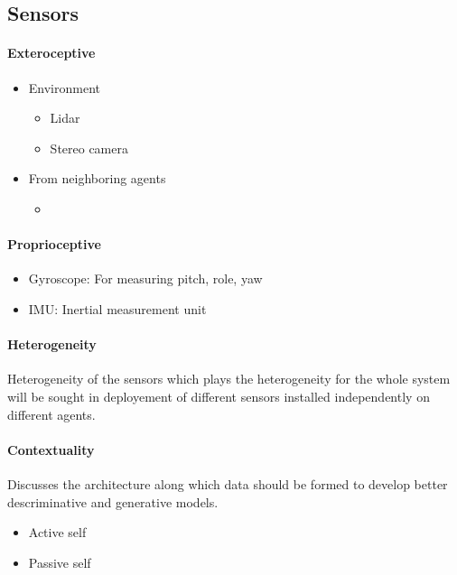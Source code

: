 \documentclass{article}
\begin{document}
		
		\subsection{Sensors}
			\paragraph{Exteroceptive}
				\begin{itemize}
					\item Environment
						\begin{itemize}
							\item Lidar
							\item Stereo camera
						\end{itemize}
					\item From neighboring agents
						\begin{itemize}
							\item 
						\end{itemize} 
				\end{itemize}
			
			\paragraph{Proprioceptive}
				\begin{itemize}
					\item Gyroscope: For measuring pitch, role, yaw
					\item IMU: Inertial measurement unit
				\end{itemize}
			
			\paragraph{Heterogeneity}
				Heterogeneity of the sensors which plays the heterogeneity for the whole system  will be sought in deployement of different sensors installed independently on different agents.  
				
			\paragraph{Contextuality}
				Discusses the architecture along which data should be formed to develop better descriminative and generative models. 
				\begin{itemize}
					\item Active self
					\item Passive self
				\end{itemize}
			
\end{document}
